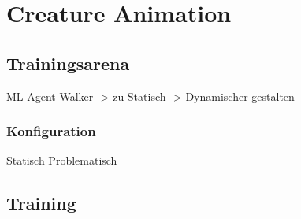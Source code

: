 \section{Creature Animation}

\subsection{Trainingsarena}
ML-Agent Walker -> zu Statisch -> Dynamischer gestalten
\subsubsection{Konfiguration}
Statisch Problematisch
\subsection{Training}

